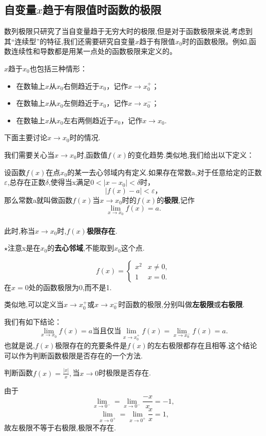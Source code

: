 	
	\subsection{自变量$x$趋于有限值时函数的极限}
	数列极限只研究了当自变量趋于无穷大时的极限,但是对于函数极限来说,考虑到其“连续型”的特征,我们还需要研究自变量$x$趋于有限值$x_0$时的函数极限。例如,函数连续性和导数都是用某一点处的函数极限来定义的。
	
	$x$趋于$x_0$也包括三种情形：
	\begin{itemize}
		\item 在数轴上$x$从$x_0$右侧趋近于$x_0$，记作$x \to x_{0}^{+}$；
		\item 在数轴上$x$从$x_0$左侧趋近于$x_0$，记作$x \to x_{0}^{-}$；
		\item 在数轴上$x$从$x_0$左右两侧趋近于$x_0$，记作$x \to x_{0}$.
	\end{itemize}

	下面主要讨论$x \to x_{0}$时的情况.
	
	我们需要关心当$x \to x_{0}$时,函数值$f(x)$的变化趋势.类似地,我们给出以下定义：
	\begin{definition}
		设函数$f(x)$在点$x_0$的某一去心邻域内有定义.如果存在常数a,对于任意给定的正数$\varepsilon$,总存在正数$\delta$,使得当x满足$0<\left|x-x_0\right|<\delta$时，
		\[
		\left|f(x)-a\right|<\varepsilon，
		\]
		那么常数a就叫做函数$f(x)$当$x\to x_0$时的$f(x)$的\textbf{极限},记作
		\[
		\lim_{x\to x_0}f(x)=a.
		\]\\
		此时,称当$x\to x_0$时,$f(x)$\textbf{极限存在}.
		
		$\star$注意x是在$x_0$的\textbf{去心邻域},不能取到$x_0$这个点.
		\
		
	\end{definition}
	
	\begin{example}
			\[
		f(x) =
		\begin{cases}
			x^2 &  x\ne 0 ,\\
			1 &  x =0 .
		\end{cases}
		\]
		在$x=0$处的函数极限为0,而不是1.
	\end{example}
	
	类似地,可以定义当$x \to x_{0}^{+}$或$x \to x_{0}^{-}$时函数的极限,分别叫做\textbf{左极限}或\textbf{右极限}.
	
	我们有如下结论：
	\[
	\lim_{x\to x_0}f(x)=a \text{当且仅当} \lim_{x\to x_{0}^{+}}f(x)=\lim_{x\to x_{0}^{-}}f(x)=a.
	\]
	也就是说,$f(x)$极限存在的充要条件是$f(x)$的左右极限都存在且相等.这个结论可以作为判断函数极限是否存在的一个方法.
	\begin{example}
		判断函数$f(x)=\frac{\left|x\right|}{x},$当$x\to 0$时极限是否存在.
	\end{example}
	\begin{solution}
		由于
		\[
		\lim_{x\to 0^-}=\lim_{x\to 0^-}\frac{-x}{x}=-1,
		\]\[
		\lim_{x\to 0^+}=\lim_{x\to 0^+}\frac{x}{x}=1,
		\]
		故左极限不等于右极限,极限不存在.
	\end{solution}

